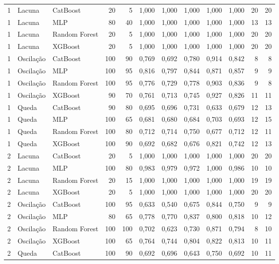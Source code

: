 \begin{longtable}{@{}rllrrrrrrrrr@{}}
1 & Lacuna & CatBoost & 20 & 5 & 1,000 & 1,000 & 1,000 & 1,000 & 1,000 & 20 & 20 \\
1 & Lacuna & MLP & 80 & 40 & 1,000 & 1,000 & 1,000 & 1,000 & 1,000 & 13 & 13 \\
1 & Lacuna & Random Forest & 20 & 5 & 1,000 & 1,000 & 1,000 & 1,000 & 1,000 & 20 & 20 \\
1 & Lacuna & XGBoost & 20 & 5 & 1,000 & 1,000 & 1,000 & 1,000 & 1,000 & 20 & 20 \\
1 & Oscilação & CatBoost & 100 & 90 & 0,769 & 0,692 & 0,780 & 0,914 & 0,842 & 8 & 8 \\
1 & Oscilação & MLP & 100 & 95 & 0,816 & 0,797 & 0,844 & 0,871 & 0,857 & 9 & 9 \\
1 & Oscilação & Random Forest & 100 & 95 & 0,776 & 0,729 & 0,778 & 0,903 & 0,836 & 9 & 8 \\
1 & Oscilação & XGBoost & 90 & 70 & 0,761 & 0,713 & 0,745 & 0,927 & 0,826 & 11 & 11 \\
1 & Queda & CatBoost & 90 & 80 & 0,695 & 0,696 & 0,731 & 0,633 & 0,679 & 12 & 13 \\
1 & Queda & MLP & 100 & 65 & 0,681 & 0,680 & 0,684 & 0,703 & 0,693 & 12 & 15 \\
1 & Queda & Random Forest & 100 & 80 & 0,712 & 0,714 & 0,750 & 0,677 & 0,712 & 12 & 11 \\
1 & Queda & XGBoost & 100 & 90 & 0,692 & 0,682 & 0,676 & 0,821 & 0,742 & 12 & 13 \\
2 & Lacuna & CatBoost & 20 & 5 & 1,000 & 1,000 & 1,000 & 1,000 & 1,000 & 20 & 20 \\
2 & Lacuna & MLP & 100 & 80 & 0,983 & 0,979 & 0,972 & 1,000 & 0,986 & 10 & 10 \\
2 & Lacuna & Random Forest & 20 & 15 & 1,000 & 1,000 & 1,000 & 1,000 & 1,000 & 19 & 19 \\
2 & Lacuna & XGBoost & 20 & 5 & 1,000 & 1,000 & 1,000 & 1,000 & 1,000 & 20 & 20 \\
2 & Oscilação & CatBoost & 100 & 95 & 0,633 & 0,540 & 0,675 & 0,844 & 0,750 & 9 & 9 \\
2 & Oscilação & MLP & 80 & 65 & 0,778 & 0,770 & 0,837 & 0,800 & 0,818 & 10 & 12 \\
2 & Oscilação & Random Forest & 100 & 100 & 0,702 & 0,623 & 0,730 & 0,871 & 0,794 & 8 & 10 \\
2 & Oscilação & XGBoost & 100 & 65 & 0,764 & 0,744 & 0,804 & 0,822 & 0,813 & 10 & 11 \\
2 & Queda & CatBoost & 100 & 90 & 0,692 & 0,696 & 0,643 & 0,750 & 0,692 & 10 & 11 \\

\end{longtable}
